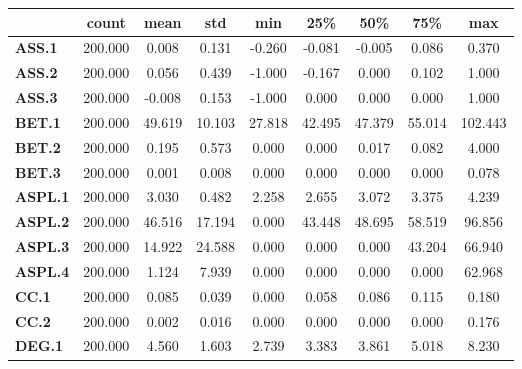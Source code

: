 \documentclass[
	article,			%
	11pt,				%
	oneside,			%
	a4paper,			%
	english,			%
	brazil,				%
	sumario=tradicional
	]{abntex2}
\begin{document}
\newpage
\begin{table}[h!]
\small
\centering
\begin{tabular}{l|c|c|c|c|c|c|c|c|}
\cline{2-9}
                                      & count   & mean     & std      & min     & 25\%    & 50\%     & 75\%     & max       \\ \hline
\multicolumn{1}{|l|}{\textbf{ASS.1}}  & 200.000 & 0.008    & 0.131    & -0.260  & -0.081  & -0.005   & 0.086    & 0.370     \\ \hline
\multicolumn{1}{|l|}{\textbf{ASS.2}}  & 200.000 & 0.056    & 0.439    & -1.000  & -0.167  & 0.000    & 0.102    & 1.000     \\ \hline
\multicolumn{1}{|l|}{\textbf{ASS.3}}  & 200.000 & -0.008   & 0.153    & -1.000  & 0.000   & 0.000    & 0.000    & 1.000     \\ \hline
\multicolumn{1}{|l|}{\textbf{BET.1}}  & 200.000 & 49.619   & 10.103   & 27.818  & 42.495  & 47.379   & 55.014   & 102.443   \\ \hline
\multicolumn{1}{|l|}{\textbf{BET.2}}  & 200.000 & 0.195    & 0.573    & 0.000   & 0.000   & 0.017    & 0.082    & 4.000     \\ \hline
\multicolumn{1}{|l|}{\textbf{BET.3}}  & 200.000 & 0.001    & 0.008    & 0.000   & 0.000   & 0.000    & 0.000    & 0.078     \\ \hline
\multicolumn{1}{|l|}{\textbf{ASPL.1}} & 200.000 & 3.030    & 0.482    & 2.258   & 2.655   & 3.072    & 3.375    & 4.239     \\ \hline
\multicolumn{1}{|l|}{\textbf{ASPL.2}} & 200.000 & 46.516   & 17.194   & 0.000   & 43.448  & 48.695   & 58.519   & 96.856    \\ \hline
\multicolumn{1}{|l|}{\textbf{ASPL.3}} & 200.000 & 14.922   & 24.588   & 0.000   & 0.000   & 0.000    & 43.204   & 66.940    \\ \hline
\multicolumn{1}{|l|}{\textbf{ASPL.4}} & 200.000 & 1.124    & 7.939    & 0.000   & 0.000   & 0.000    & 0.000    & 62.968    \\ \hline
\multicolumn{1}{|l|}{\textbf{CC.1}}   & 200.000 & 0.085    & 0.039    & 0.000   & 0.058   & 0.086    & 0.115    & 0.180     \\ \hline
\multicolumn{1}{|l|}{\textbf{CC.2}}   & 200.000 & 0.002    & 0.016    & 0.000   & 0.000   & 0.000    & 0.000    & 0.176     \\ \hline
\multicolumn{1}{|l|}{\textbf{DEG.1}}  & 200.000 & 4.560    & 1.603    & 2.739   & 3.383   & 3.861    & 5.018    & 8.230     \\ \hline

\end{tabular}
\end{table}
\end{document}
